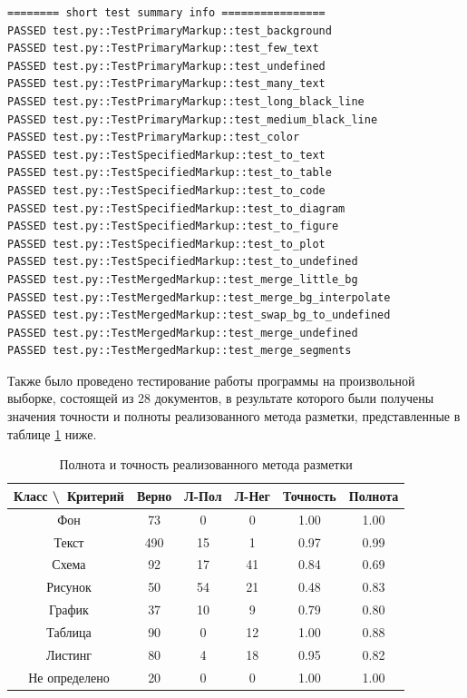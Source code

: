 \begin{lstlisting}[caption={Результаты тестирования}, label={lst:test}]
======== short test summary info ================
PASSED test.py::TestPrimaryMarkup::test_background
PASSED test.py::TestPrimaryMarkup::test_few_text
PASSED test.py::TestPrimaryMarkup::test_undefined
PASSED test.py::TestPrimaryMarkup::test_many_text
PASSED test.py::TestPrimaryMarkup::test_long_black_line
PASSED test.py::TestPrimaryMarkup::test_medium_black_line
PASSED test.py::TestPrimaryMarkup::test_color
PASSED test.py::TestSpecifiedMarkup::test_to_text
PASSED test.py::TestSpecifiedMarkup::test_to_table
PASSED test.py::TestSpecifiedMarkup::test_to_code
PASSED test.py::TestSpecifiedMarkup::test_to_diagram
PASSED test.py::TestSpecifiedMarkup::test_to_figure
PASSED test.py::TestSpecifiedMarkup::test_to_plot
PASSED test.py::TestSpecifiedMarkup::test_to_undefined
PASSED test.py::TestMergedMarkup::test_merge_little_bg
PASSED test.py::TestMergedMarkup::test_merge_bg_interpolate
PASSED test.py::TestMergedMarkup::test_swap_bg_to_undefined
PASSED test.py::TestMergedMarkup::test_merge_undefined
PASSED test.py::TestMergedMarkup::test_merge_segments
\end{lstlisting}

\newpage

Также было проведено тестирование работы программы на произвольной выборке, состоящей из 28 документов, в результате которого были получены значения точности и полноты реализованного метода разметки, представленные в таблице \ref{tab:precrec} ниже.

\begin{table}[H]
    \centering
    \caption{Полнота и точность реализованного метода разметки}
    \label{tab:precrec}
    \begin{center}
        \begin{tabular}{|c|c|c|c|c|c|}
            \hline
            \textbf{Класс \textbackslash\ Критерий} & \textbf{Верно} & \textbf{Л-Пол} & \textbf{Л-Нег} & \textbf{Точность} & \textbf{Полнота} \\ \hline
            Фон & 73 & 0 & 0 & 1.00 & 1.00 \\ \hline
            Текст & 490 & 15 & 1 & 0.97 & 0.99 \\ \hline
            Схема & 92 & 17 & 41 & 0.84 & 0.69 \\ \hline
            Рисунок & 50 & 54 & 21 & 0.48 & 0.83 \\ \hline
            График & 37 & 10 & 9 & 0.79 & 0.80 \\ \hline
            Таблица & 90 & 0 & 12 & 1.00 & 0.88 \\ \hline
            Листинг & 80 & 4 & 18 & 0.95 & 0.82 \\ \hline
            Не определено & 20 & 0 & 0 & 1.00 & 1.00 \\ \hline
        \end{tabular}
    \end{center}
\end{table}

